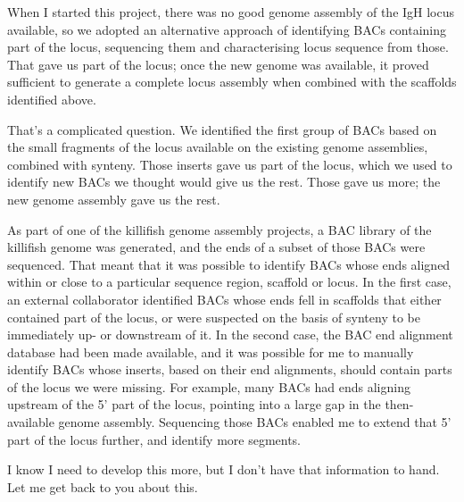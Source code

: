 When I started this project, there was no good genome assembly of the IgH locus available, so we adopted an alternative approach of identifying BACs containing part of the locus, sequencing them and characterising locus sequence from those. That gave us part of the locus; once the new genome was available, it proved sufficient to generate a complete locus assembly when combined with the scaffolds identified above.


That's a complicated question. We identified the first group of BACs based on the small fragments of the locus available on the existing genome assemblies, combined with synteny. Those inserts gave us part of the locus, which we used to identify new BACs we thought would give us the rest. Those gave us more; the new genome assembly gave us the rest.


As part of one of the killifish genome assembly projects, a BAC library of the killifish genome was generated, and the ends of a subset of those BACs were sequenced. That meant that it was possible to identify BACs whose ends aligned within or close to a particular sequence region, scaffold or locus. In the first case, an external collaborator identified BACs whose ends fell in scaffolds that either contained part of the locus, or were suspected on the basis of synteny to be immediately up- or downstream of it. In the second case, the BAC end alignment database had been made available, and it was possible for me to manually identify BACs whose inserts, based on their end alignments, should contain parts of the locus we were missing. For example, many BACs had ends aligning upstream of the 5' part of the locus, pointing into a large gap in the then-available genome assembly. Sequencing those BACs enabled me to extend that 5' part of the locus further, and identify more segments.


I know I need to develop this more, but I don't have that information to hand. Let me get back to you about this.


